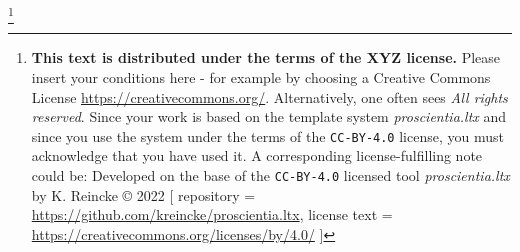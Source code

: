 

\footnote{\textbf{This text is distributed under the terms of the XYZ license.} Please insert your conditions here - for example by choosing a Creative Commons License \href{https://creativecommons.org/}{https://creativecommons.org/}. Alternatively, one often sees \emph{All rights reserved}. \newline
Since your work is based on the template system \textit{proscientia.ltx} and since you use the system under the terms of the \texttt{CC-BY-4.0} license, you must acknowledge that you have used it. A corresponding license-fulfilling note could be:\newline
Developed on the base of the \texttt{CC-BY-4.0} licensed tool \textit{proscientia.ltx} by K. Reincke \copyright{} 2022 [
repository = \href{https://github.com/kreincke/proscientia.ltx}{https://github.com/kreincke/proscientia.ltx},
license text = \href{https://creativecommons.org/licenses/by/4.0/}{https://creativecommons.org/licenses/by/4.0/} ]
}
